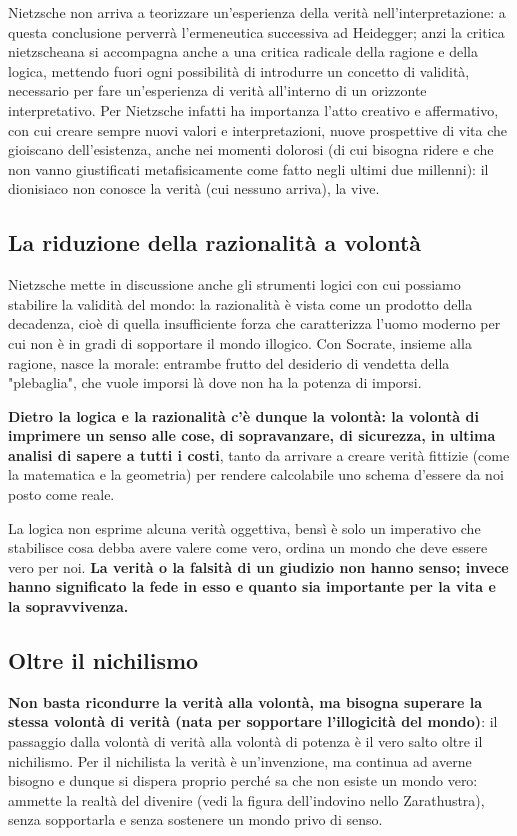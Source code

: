Nietzsche non arriva a teorizzare un'esperienza della verità nell'interpretazione: a questa conclusione perverrà l'ermeneutica successiva ad Heidegger; anzi la critica nietzscheana si accompagna anche a una critica radicale della ragione e della logica, mettendo fuori ogni possibilità di introdurre un concetto di validità, necessario per fare un'esperienza di verità all'interno di un orizzonte interpretativo. Per Nietzsche infatti ha importanza l'atto creativo e affermativo, con cui creare sempre nuovi valori e interpretazioni, nuove prospettive di vita che gioiscano  dell'esistenza, anche nei momenti dolorosi (di cui bisogna ridere e che non vanno giustificati metafisicamente come fatto negli ultimi due millenni): il dionisiaco non conosce la verità (cui nessuno arriva), la vive.

\subsection{La riduzione della razionalità a volontà}

Nietzsche mette in discussione anche gli strumenti logici con cui possiamo stabilire la validità del mondo: la razionalità è vista come un prodotto della decadenza, cioè di quella insufficiente forza che caratterizza l'uomo moderno per cui non è in gradi di sopportare il mondo illogico.
Con Socrate, insieme alla ragione, nasce la morale: entrambe frutto del desiderio di vendetta della "plebaglia", che vuole imporsi là dove non ha la potenza di imporsi.

\textbf{Dietro la logica e la razionalità c'è dunque la volontà: la volontà di imprimere un senso alle cose, di sopravanzare, di sicurezza, in ultima analisi di sapere a tutti i costi}, tanto da arrivare a creare verità fittizie (come la matematica e la geometria) per rendere calcolabile uno schema d'essere da noi posto come reale.

La logica non esprime alcuna verità oggettiva, bensì è solo un imperativo che stabilisce cosa debba avere valere come vero, ordina un mondo che deve essere vero per noi. \textbf{La verità o la falsità di un giudizio non hanno senso; invece hanno significato la fede in esso e quanto sia importante per la vita e la sopravvivenza.}

\subsection{Oltre il nichilismo}

\textbf{Non basta ricondurre la verità alla volontà, ma bisogna superare la stessa volontà di verità (nata per sopportare l'illogicità del mondo)}: il passaggio dalla volontà di verità alla volontà di potenza è il vero salto oltre il nichilismo. Per il nichilista la verità è un'invenzione, ma continua ad averne bisogno e dunque si dispera proprio perché sa che non esiste un mondo vero: ammette la realtà del divenire (vedi la figura dell'indovino nello Zarathustra), senza sopportarla e senza sostenere un mondo privo di senso.

